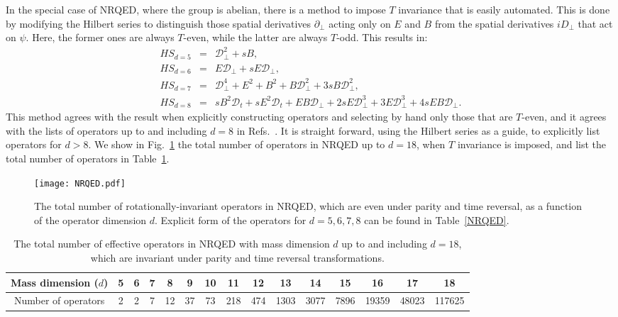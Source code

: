 \documentclass[prd,onecolumn, nofootinbib, 11pt]{revtex4}
\begin{document}
In the special case of NRQED, where the group is abelian, there is a method to impose $T$ invariance that is easily automated.  This is done by modifying the Hilbert series to distinguish those spatial derivatives $\partial_\perp$ acting only on $E$ and $B$ from the spatial derivatives $iD_\perp$ that act on $\psi$. Here, the former ones are always $T$-even, while the latter are always $T$-odd.  This results in:
%
\begin{eqnarray}
HS_{d=5} &=& \mathcal{D}_\perp^2 + sB , \\
HS_{d=6} &=& E\mathcal{D}_\perp + sE\mathcal{D}_\perp , \\
HS_{d=7} &=& \mathcal{D}_\perp^4 + E^2 + B^2 + B \mathcal{D}_\perp^2 + 3 sB\mathcal{D}_\perp^2 , \\
HS_{d=8} &=& sB^2 \mathcal{D}_t + sE^2 \mathcal{D}_t + EB\mathcal{D}_\perp + 2sE\mathcal{D}_\perp^3 + 3E\mathcal{D}_\perp^3+ 4 sEB\mathcal{D}_\perp .
\end{eqnarray}
%
This method agrees with the result when explicitly constructing operators and selecting by hand only those that are $T$-even, and it agrees with the lists of operators up to and including $d=8$ in Refs.~\cite{Caswell:1985ui, Kinoshita:1995mt, Manohar:1997qy, Hill:2012rh}.  It is straight forward, using the Hilbert series as a guide, to explicitly list operators for $d>8$.  We show in Fig.~\ref{QEDfig} the total number of operators in NRQED up to $d=18$, when $T$ invariance is imposed, and list the total number of operators in Table~\ref{NRQEDnums}.  


\begin{figure}[h!]
\centering
\texttt{[image: NRQED.pdf]}
\caption{The total number of rotationally-invariant operators in NRQED, which are even under parity and time reversal, as a function of the operator dimension $d$. Explicit form of the operators for $d=5,6,7,8$ can be found in Table~\ref{NRQED}. }
\label{QEDfig}
\end{figure}


\begin{table}[h!tbp]
\centering
\begin{tabular}{| c || c | c | c | c | c | c | c | c | c | c | c | c | c | c | }
\hline
Mass dimension ($d$) & 5 & 6 & 7 & 8 & 9 & 10 & 11 & 12 & 13 & 14 & 15 & 16 & 17 & 18 \\ \hline  
Number of operators & 2 & 2 & 7 & 12 & 37 & 73 & 218 & 474 & 1303 & 3077 & 7896 & 19359 & 48023 & 117625 \\ \hline
\end{tabular}
\caption{The total number of effective operators in NRQED with mass dimension $d$ up to and including $d=18$, which are invariant under parity and time reversal transformations. }
\label{NRQEDnums}
\end{table}
\end{document}
